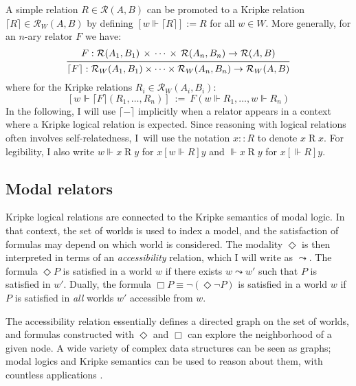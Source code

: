 \documentclass[11pt,oneside]{book}
\theoremstyle{definition}
\newcommand{\ifr}[1]{\mathrel{[{#1}]}}
\begin{document}
A simple relation $R \in \mathcal{R}(A, B)$
can be promoted to a Kripke relation
$\lceil R \rceil \in \mathcal{R}_W(A, B)$
by defining $[w \Vdash \lceil R \rceil] := R$ for all $w \in W$.
More generally, for an $n$-ary relator $F$ we have:
\[
  \begin{prooftree}
  \hypo{
    F :
      \mathcal{R}(A_1, B_1) \,\times\,\cdots\,\times\,\mathcal{R}(A_n, B_n)
      \rightarrow \mathcal{R}(A, B)}
  \infer1{
    \lceil F \rceil :
      \mathcal{R}_W(A_1, B_1) \times \cdots \times \mathcal{R}_W(A_n, B_n)
      \rightarrow \mathcal{R}_W(A, B)}
  \end{prooftree}
\]
where for the Kripke relations $R_i \in \mathcal{R}_W(A_i, B_i)$:
\[
  [w \Vdash \lceil F \rceil (R_1, \ldots, R_n)] \: := \:
    F(w \Vdash R_1, \ldots, w \Vdash R_n)
\]
In the following,
I will use $\lceil - \rceil$ implicitly
when a relator appears in a context where
a Kripke logical relation is expected.
Since reasoning with logical relations
often involves self-relatedness,
I~will use the notation
$x :: R$ to denote $x \mathrel{R} x$.
For legibility, I also write
$w \Vdash x \mathrel{R} y$ for $x \ifr{w \Vdash R} y$
and $\Vdash x \mathrel{R} y$ for $x \ifr{\Vdash R} y$.


\subsection{Modal relators} \label{sec:modrel} %

Kripke logical relations are connected to
the Kripke semantics of modal logic.
In that context,
the set of worlds is used to index a model,
and the satisfaction of formulas may depend on
which world is considered.
The modality $\Diamond$ is then interpreted in terms of
an \emph{accessibility} relation, which I will write as $\leadsto$.
The formula $\Diamond P$ is satisfied in a world $w$
if there exists $w \leadsto w'$ such that $P$ is satisfied in $w'$.
Dually,
the formula $\Box P \equiv \neg (\Diamond \neg P)$
is satisfied in a world $w$
if $P$ is satisfied in \emph{all} worlds $w'$
accessible from $w$.

The accessibility relation essentially defines
a directed graph on the set of worlds,
and formulas constructed with $\Diamond$ and $\Box$
can explore the neighborhood of a given node.
A wide variety of complex data structures
can be seen as graphs;
modal logics and Kripke semantics
can be used to reason about them,
with countless applications
\citep{modlog}.
\end{document}
